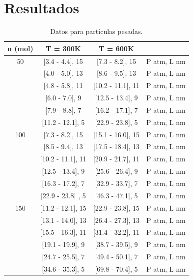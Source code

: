 \documentclass[]{article}
\begin{document}
\section{Resultados}
\begin{table}[!h]
 \centering
 \begin{tabular}{|c|c|c|l|} \hline
  n (mol)&  T = 300K        &    T = 600K    &        \\ \hline
   50    & [3.4 - 4.4], 15 & [7.3 - 8.2], 15& P atm, L nm\\ 
         & [4.0 - 5.0], 13 & [8.6 - 9.5], 13& P atm, L nm\\
         & [4.8 - 5.8], 11 & [10.2 - 11.1], 11& P atm, L nm\\ 
         & [6.0 - 7.0],  9 & [12.5 - 13.4],  9& P atm, L nm\\ 
         & [7.9 - 8.8],  7 & [16.2 - 17.1],  7& P atm, L nm\\  
         & [11.2 - 12.1], 5 & [22.9 - 23.8],  5& P atm, L nm\\ \hline
   100   & [7.3 - 8.2], 15 & [15.1 - 16.0], 15& P atm, L nm\\ 
         & [8.5 - 9.4], 13 & [17.5 - 18.4], 13& P atm, L nm\\
         & [10.2 - 11.1], 11 & [20.9 - 21.7], 11& P atm, L nm\\ 
         & [12.5 - 13.4], 9 & [25.6 - 26.4],  9& P atm, L nm\\ 
         & [16.3 - 17.2], 7 & [32.9 - 33.7],  7& P atm, L nm\\  
         & [22.9 - 23.8] , 5 & [46.3 - 47.1],  5& P atm, L nm\\ \hline
   150   & [11.2 - 12.1], 15 & [22.9 - 23.8], 15& P atm, L nm\\ 
         & [13.1 - 14.0], 13 & [26.4 - 27.3], 13& P atm, L nm\\
         & [15.5 - 16.3], 11 & [31.4 - 32.2], 11& P atm, L nm\\ 
         & [19.1 - 19.9],  9 & [38.7 - 39.5],  9& P atm, L nm\\ 
         & [24.7 - 25.5],  7 & [49.4 - 50.1],  7& P atm, L nm\\  
         & [34.6 - 35.3],  5 & [69.8 - 70.4],  5& P atm, L nm\\ \hline

   

\end{tabular}
\caption{\label{tab:Pesadas} Datos para partículas pesadas.}
\end{table}
\end{document}

